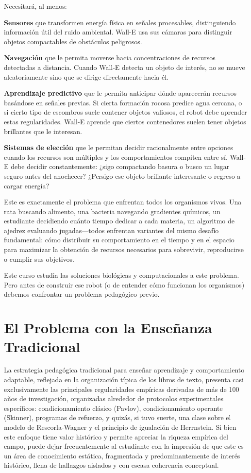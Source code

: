 \documentclass[
  letterpaper,
  DIV=11,
  numbers=noendperiod]{scrreprt}
\begin{document}
Necesitará, al menos:

\textbf{Sensores} que transformen energía física en señales procesables,
distinguiendo información útil del ruido ambiental. Wall-E usa sus
cámaras para distinguir objetos compactables de obstáculos peligrosos.

\textbf{Navegación} que le permita moverse hacia concentraciones de
recursos detectadas a distancia. Cuando Wall-E detecta un objeto de
interés, no se mueve aleatoriamente sino que se dirige directamente
hacia él.

\textbf{Aprendizaje predictivo} que le permita anticipar dónde
aparecerán recursos basándose en señales previas. Si cierta formación
rocosa predice agua cercana, o si cierto tipo de escombros suele
contener objetos valiosos, el robot debe aprender estas regularidades.
Wall-E aprende que ciertos contenedores suelen tener objetos brillantes
que le interesan.

\textbf{Sistemas de elección} que le permitan decidir racionalmente
entre opciones cuando los recursos son múltiples y los comportamientos
compiten entre sí. Wall-E debe decidir constantemente: ¿sigo compactando
basura o busco un lugar seguro antes del anochecer? ¿Persigo ese objeto
brillante interesante o regreso a cargar energía?

Este es exactamente el problema que enfrentan todos los organismos
vivos. Una rata buscando alimento, una bacteria navegando gradientes
químicos, un estudiante decidiendo cuánto tiempo dedicar a cada materia,
un algoritmo de ajedrez evaluando jugadas---todos enfrentan variantes
del mismo desafío fundamental: cómo distribuir su comportamiento en el
tiempo y en el espacio para maximizar la obtención de recursos
necesarios para sobrevivir, reproducirse o cumplir sus objetivos.

Este curso estudia las soluciones biológicas y computacionales a este
problema. Pero antes de construir ese robot (o de entender cómo
funcionan los organismos) debemos confrontar un problema pedagógico
previo.

\section{El Problema con la Enseñanza
Tradicional}\label{el-problema-con-la-enseuxf1anza-tradicional}

La estrategia pedagógica tradicional para enseñar aprendizaje y
comportamiento adaptable, reflejada en la organización típica de los
libros de texto, presenta casi exclusivamente las principales
regularidades empíricas derivadas de más de 100 años de investigación,
organizadas alrededor de protocolos experimentales específicos:
condicionamiento clásico (Pavlov), condicionamiento operante (Skinner),
programas de refuerzo, y quizás, si tuvo suerte, una clase sobre el
modelo de Rescorla-Wagner y el principio de igualación de Herrnstein. Si
bien este enfoque tiene valor histórico y permite apreciar la riqueza
empírica del campo, puede dejar frecuentemente al estudiante con la
impresión de que este es un área de conocimiento estática, fragmentada y
predominantemente de interés histórico, llena de hallazgos aislados y
con escasa coherencia conceptual.
\end{document}

